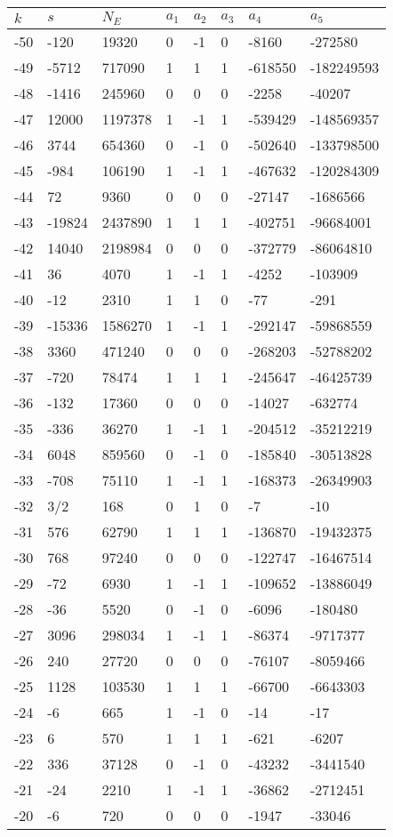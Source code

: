 \documentclass{amsart}
\begin{document}
\begin{longtable}{|l|l|l|lllll|}
\hline
$k$ & $s$ & $N_E$ & $a_1$ & $a_2$ & $a_3$ & $a_4$ & $a_5$\\
\hline
-50&-120&19320&0&-1&0&-8160&-272580\\
-49&-5712&717090&1&1&1&-618550&-182249593\\
-48&-1416&245960&0&0&0&-2258&-40207\\
-47&12000&1197378&1&-1&1&-539429&-148569357\\
-46&3744&654360&0&-1&0&-502640&-133798500\\
-45&-984&106190&1&-1&1&-467632&-120284309\\
-44&72&9360&0&0&0&-27147&-1686566\\
-43&-19824&2437890&1&1&1&-402751&-96684001\\
-42&14040&2198984&0&0&0&-372779&-86064810\\
-41&36&4070&1&-1&1&-4252&-103909\\
-40&-12&2310&1&1&0&-77&-291\\
-39&-15336&1586270&1&-1&1&-292147&-59868559\\
-38&3360&471240&0&0&0&-268203&-52788202\\
-37&-720&78474&1&1&1&-245647&-46425739\\
-36&-132&17360&0&0&0&-14027&-632774\\
-35&-336&36270&1&-1&1&-204512&-35212219\\
-34&6048&859560&0&-1&0&-185840&-30513828\\
-33&-708&75110&1&-1&1&-168373&-26349903\\
-32&3/2&168&0&1&0&-7&-10\\
-31&576&62790&1&1&1&-136870&-19432375\\
-30&768&97240&0&0&0&-122747&-16467514\\
-29&-72&6930&1&-1&1&-109652&-13886049\\
-28&-36&5520&0&-1&0&-6096&-180480\\
-27&3096&298034&1&-1&1&-86374&-9717377\\
-26&240&27720&0&0&0&-76107&-8059466\\
-25&1128&103530&1&1&1&-66700&-6643303\\
-24&-6&665&1&-1&0&-14&-17\\
-23&6&570&1&1&1&-621&-6207\\
-22&336&37128&0&-1&0&-43232&-3441540\\
-21&-24&2210&1&-1&1&-36862&-2712451\\
-20&-6&720&0&0&0&-1947&-33046\\

\end{longtable}
\end{document}
